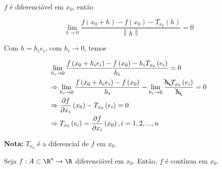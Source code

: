 \documentclass[11pt, oneside, a4paper]{gsm-l}
\begin{document}
\begin{dem}
$f$ é diferenciável em $x_0$, então

\[
    \mathop {\lim }\limits_{h \to 0} \frac{{f\left( {x_0  + h} \right) - f\left( {x_0 } \right) - T_{x_0 } \left( h \right)}}{{\left\| h \right\|}} = 0
\]

Com $h = h_i e_i$, com $h_i \to 0$, temos

\[
\begin{gathered}
  \mathop {\lim }\limits_{h_i  \to 0} \frac{{f\left( {x_0  + h_i e_i } \right) - f\left( {x_0 } \right) - h_i T_{x_0 } \left( {e_i } \right)}}
{{h_i }} = 0 \hfill \\
   \Rightarrow \mathop {\lim }\limits_{h_i  \to 0} \frac{{f\left( {x_0  + h_i e_i } \right) - f\left( {x_0 } \right)}}
{{h_i }} - \mathop {\lim }\limits_{h_i  \to 0} \frac{{\bcancel{h_i} T_{x_0 } \left( {e_i } \right)}}{{\bcancel{h_i} }} = 0 \hfill \\
\Rightarrow \frac{{\partial f}}
{{\partial x_i }}\left( {x_0 } \right) - T_{x_0 } \left( {e_i } \right) = 0 \hfill \\
\Rightarrow T_{x_0 } \left( {e_i } \right) = \frac{{\partial f}}
{{\partial x_i }}\left( {x_0 } \right),i = 1,2,...,n \hfill \\
\end{gathered}
\]

\end{dem}

\textbf{Nota:} $T_{x_0 }$ é a diferencial de $f$ em $x_0$.

\begin{teo}
    Seja $f:A \subset \R^n \to \R$ diferenciável em $x_0$. Então, $f$ é contínua em $x_0$.
\end{teo}
\end{document}
